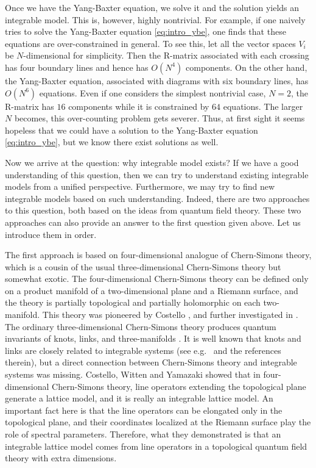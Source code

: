 Once we have the Yang-Baxter equation, we solve it and the solution yields an
integrable model.
This is, however, highly nontrivial.
For example, if one naively tries to solve the Yang-Baxter equation \eqref{eq:intro_ybe},
one finds that these equations are over-constrained in general.
To see this, let all the vector spaces $V_i$ be $N$-dimensional for simplicity.
Then the R-matrix associated with each crossing has four boundary lines and hence
has $O(N^4)$ components.
On the other hand, the Yang-Baxter equation, associated with diagrams with six boundary lines,
has $O(N^6)$ equations.
Even if one considers the simplest nontrivial case, $N=2$, the R-matrix has $16$ components
while it is constrained by $64$ equations.
The larger $N$ becomes, this over-counting problem gets severer.
Thus, at first sight it seems hopeless that we could have a solution to the Yang-Baxter equation
\eqref{eq:intro_ybe},
but we know there exist solutions as well.


Now we arrive at the question: why integrable model exists?
If we have a good understanding of this question, then we can try to understand existing
integrable models from a unified perspective.
Furthermore, we may try to find new integrable models based on such understanding.
%
Indeed, there are two approaches to this question, both based on the ideas from quantum
field theory.
These two approaches can also provide an answer to the first question given above.
Let us introduce them in order.


The first approach is based on four-dimensional analogue of Chern-Simons theory,
which is a cousin of the usual three-dimensional Chern-Simons theory but somewhat exotic.
The four-dimensional Chern-Simons theory can be defined only on a product manifold of a two-dimensional plane
and a Riemann surface, and the theory is partially topological and partially holomorphic on each two-manifold.
This theory was pioneered by Costello \cite{Costello:2013zra,Costello:2013sla},
and further investigated in \cite{Costello:2017dso,Costello:2018gyb,Costello:2019tri}.
The ordinary three-dimensional Chern-Simons theory produces
quantum invariants of knots, links, and three-manifolds \cite{Witten:1988hf}.
It is well known that knots and links are closely related to integrable systems
(see e.g.~\cite{Wadati:1989ud} and the references therein),
but a direct connection between Chern-Simons theory and integrable systems was missing.
Costello, Witten and Yamazaki showed that in four-dimensional Chern-Simons theory, line operators
extending the topological plane generate a lattice model, and it is really an integrable lattice model.
An important fact here is that the line operators can be elongated only in the topological plane,
and their coordinates localized at the Riemann surface play the role of spectral parameters.
Therefore, what they demonstrated is that an integrable lattice model comes from line operators in a topological
quantum field theory with extra dimensions.


